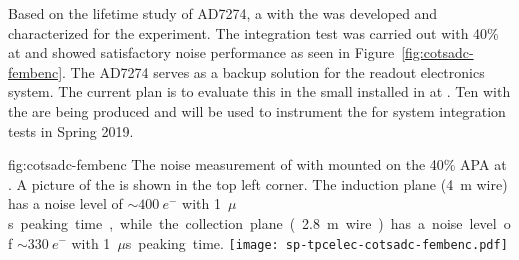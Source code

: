 Based on the lifetime study of AD7274, a  with the  
 was developed and characterized for the  experiment. The 
integration test was carried out with 40\%  at  and 
showed satisfactory noise performance as seen in Figure~\ref{fig:cotsadc-fembenc}. 
The   AD7274 serves as a backup solution for the 
   readout electronics system. The current 
plan is to evaluate this  in the small  installed in
 at . Ten  with the  
 are being produced and will be used to instrument the  
 for system integration tests in Spring 2019. 

\begin{dunefigure}
{fig:cotsadc-fembenc}
{The noise measurement of  with   
mounted on the \num{40}\% APA at . A picture of the 
 is shown in the top left corner. The induction plane 
(\SI{4}{m} wire) has a noise level of $\sim\SI{400}{e^-}$ with \SI{1}{$\mu$s} 
peaking time, while the collection plane (\SI{2.8}{m} wire) has a noise level
of $\sim\SI{330}{e^-}$ with \SI{1}{$\mu$s} peaking time.}
\texttt{[image: sp-tpcelec-cotsadc-fembenc.pdf]}
\end{dunefigure}

\label{sec:fdsp-tpcelec-design-femb-alt-cryo}


